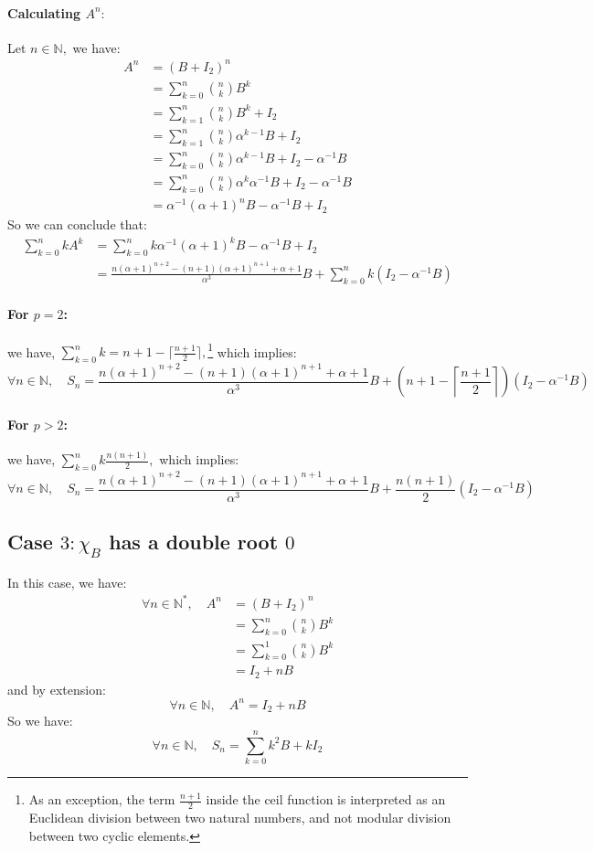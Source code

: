 \documentclass[]{article}
\begin{document}
\paragraph{Calculating $A^n:$}
Let $n\in\mathbb{N},$ we have:
\begin{align*}
	A^n&= (B+I_2)^n\\
	&= \sum_{k=0}^n {n \choose k} B^k \\
	&= \sum_{k=1}^n {n \choose k} B^k +I_2\\
	&= \sum_{k=1}^n {n \choose k} \alpha^{k-1}B +I_2\\
	&= \sum_{k=0}^n {n \choose k} \alpha^{k-1}B +I_2 - \alpha^{-1}B\\
	&= \sum_{k=0}^n {n \choose k} \alpha^{k}\alpha^{-1}B +I_2 - \alpha^{-1}B\\
	&=\alpha^{-1}(\alpha+1)^nB-\alpha^{-1}B+I_2
\end{align*}
So we can conclude that:
\begin{align*}
\sum_{k=0}^n kA^k&=\sum_{k=0}^n k\alpha^{-1}(\alpha+1)^kB-\alpha^{-1}B+I_2 \\
&= \frac{n(\alpha+1)^{n+2}-(n+1)(\alpha+1)^{n+1}+\alpha+1}{\alpha^3}B+\sum_{k=0}^nk(I_2-\alpha^{-1}B)
\end{align*}
\paragraph{For $p=2$:}
we have, $\sum_{k=0}^nk=n+1-\lceil \frac{n+1}{2}\rceil,$\footnote{As an exception, the term $\frac{n+1}{2}$ inside the ceil function is interpreted as an Euclidean division between two natural numbers, and not modular division between two cyclic elements.} which implies:
$$
\boxed{\forall n\in\mathbb{N}, \quad S_n = \frac{n(\alpha+1)^{n+2}-(n+1)(\alpha+1)^{n+1}+\alpha+1}{\alpha^3}B+\left(n+1-\left\lceil \frac{n+1}{2}\right\rceil\right)\left(I_2-\alpha^{-1}B\right)}
$$
\paragraph{For $p>2$:}
we have, $\sum_{k=0}^nk\frac{n(n+1)}{2},$ which implies:
$$
\boxed{\forall n\in\mathbb{N}, \quad S_n = \frac{n(\alpha+1)^{n+2}-(n+1)(\alpha+1)^{n+1}+\alpha+1}{\alpha^3}B+\frac{n(n+1)}{2}\left(I_2-\alpha^{-1}B\right)}
$$
\subsection{Case $3: \chi_B$ has a double root $0$}
In this case, we have:
\begin{align*}
\forall n \in\mathbb{N}^*,\quad A^n&=(B+I_2)^n\\
&=\sum_{k=0}^n {n \choose k} B^k \\
&=\sum_{k=0}^1 {n \choose k} B^k \\
&=I_2 + nB
\end{align*}
and by extension: 
$$
\forall n\in\mathbb{N}, \quad A^n=I_2+nB
$$
So we have:
$$
\boxed{\forall n\in\mathbb{N},\quad S_n = \sum_{k=0}^nk^2B+kI_2}
$$
\end{document}
